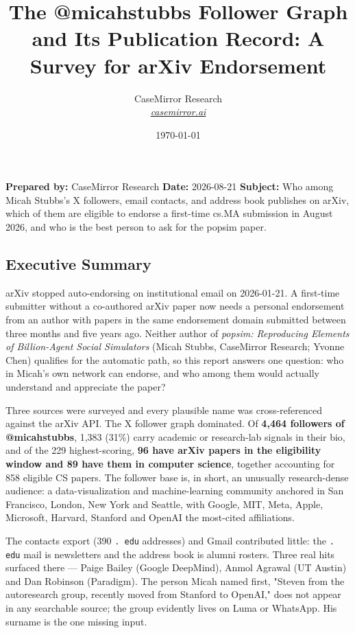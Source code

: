 \documentclass[twocolumn,10pt,letterpaper]{article}
\title{\vspace{-1.8em}\LARGE\bfseries\color{titlebg} The @micahstubbs Follower Graph and Its Publication Record: A Survey for arXiv Endorsement\vspace{-0.3em}}
\author{CaseMirror Research \\ \small\itshape\href{https://casemirror.ai}{\textcolor{headergray}{casemirror.ai}}}
\date{{\small\color{headergray} \today}}
\begin{document}
\maketitle
\thispagestyle{firstpage}
\vspace{-0.5em}


\textbf{Prepared by:} CaseMirror Research \textbf{Date:} 2026-08-21 \textbf{Subject:} Who among Micah Stubbs's X followers, email contacts, and address book publishes on arXiv, which of them are eligible to endorse a first-time cs.MA submission in August 2026, and who is the best person to ask for the popsim paper.


\subsection{Executive Summary}

arXiv stopped auto-endorsing on institutional email on 2026-01-21. A first-time submitter without a co-authored arXiv paper now needs a personal endorsement from an author with papers in the same endorsement domain submitted between three months and five years ago. Neither author of \textit{popsim: Reproducing Elements of Billion-Agent Social Simulators} (Micah Stubbs, CaseMirror Research; Yvonne Chen) qualifies for the automatic path, so this report answers one question: who in Micah's own network can endorse, and who among them would actually understand and appreciate the paper?


Three sources were surveyed and every plausible name was cross-referenced against the arXiv API. The X follower graph dominated. Of \textbf{4,464 followers of @micahstubbs}, 1,383 (31\%) carry academic or research-lab signals in their bio, and of the 229 highest-scoring, \textbf{96 have arXiv papers in the eligibility window and 89 have them in computer science}, together accounting for 858 eligible CS papers. The follower base is, in short, an unusually research-dense audience: a data-visualization and machine-learning community anchored in San Francisco, London, New York and Seattle, with Google, MIT, Meta, Apple, Microsoft, Harvard, Stanford and OpenAI the most-cited affiliations.


The contacts export (390 \texttt{. edu} addresses) and Gmail contributed little: the \texttt{. edu} mail is newsletters and the address book is alumni rosters. Three real hits surfaced there — Paige Bailey (Google DeepMind), Anmol Agrawal (UT Austin) and Dan Robinson (Paradigm). The person Micah named first, "Steven from the autoresearch group, recently moved from Stanford to OpenAI," does not appear in any searchable source; the group evidently lives on Luma or WhatsApp. His surname is the one missing input.
\end{document}
